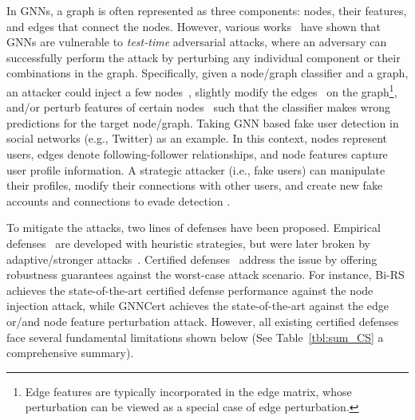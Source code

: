 In GNNs, a graph is often represented as three components: nodes, their features, and edges that connect the nodes.
However, various works~\cite{zugner2018adversarial,dai2018adversarial,wu2019adversarial,wang2019attacking,xu2019topology,sun2020adversarial,zhang2021backdoor,wan2021adversarial,zhang2022projective,ma2020towards,mu2021a,wang2022bandits,wang2023turning,chenunderstanding,ju2023let,wang2024efficient} have shown that GNNs are vulnerable to \emph{test-time} adversarial attacks, where an adversary can successfully perform the attack by perturbing any  individual component or their combinations in the graph.   
Specifically, given a node/graph classifier and a graph, an attacker could inject a few nodes~\cite{sun2020adversarial,ju2023let}, slightly modify the edges~\cite{zugner2018adversarial,xu2019topology,wang2019attacking} on the graph\footnote{Edge features are typically incorporated in the edge matrix, whose perturbation can be viewed as a special case of edge perturbation.}, and/or perturb features of certain nodes~\cite{zugner2018adversarial} such that the classifier makes wrong predictions for the target node/graph.
Taking GNN based fake user detection in social networks (e.g., Twitter) as an example. In this context, nodes represent users, edges denote following-follower relationships, and node features capture user profile information. A strategic attacker (i.e., fake users) can manipulate their profiles, modify their connections with other users, and create new fake accounts and connections to evade detection \cite{wang2017gang}. 




To mitigate the attacks, two lines of defenses have been proposed. 
Empirical defenses~\cite{wu2019adversarial,xu2019topology,zhu2019robust,entezari2020all,tao2021adversarial,zhao2021expressive} are developed with heuristic strategies, but were later broken by adaptive/stronger attacks~\cite{mujkanovic2022defenses}.
Certified defenses~\cite{bojchevski2020efficient,jin2020certified,jia2020certified,wang2021certified,xia2024gnncert,lai2023nodeawarebismoothingcertifiedrobustness} address the issue by offering robustness guarantees against the worst-case attack scenario. For instance, Bi-RS \cite{lai2023nodeawarebismoothingcertifiedrobustness} achieves the state-of-the-art certified defense performance against the node injection attack, while GNNCert \cite{xia2024gnncert} achieves the state-of-the-art against the edge or/and node feature perturbation attack. 
However, all existing certified defenses face several fundamental limitations shown below  (See Table~\ref{tbl:sum_CS} a comprehensive summary). 

